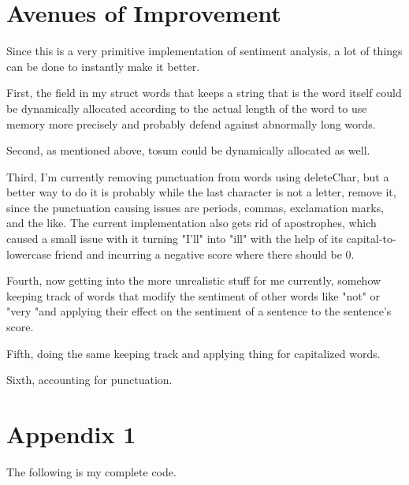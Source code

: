 \documentclass{article}
\begin{document}
\section{Avenues of Improvement}

Since this is a very primitive implementation of sentiment analysis, a lot of things can be done to instantly make it better. 

First, the field in my struct words that keeps a string that is the word itself could be dynamically allocated according to the actual length of the word to use memory more precisely and probably defend against abnormally long words. 

Second, as mentioned above, tosum could be dynamically allocated as well. 

Third, I'm currently removing punctuation from words using deleteChar, but a better way to do it is probably while the last character is not a letter, remove it, since the punctuation causing issues are periods, commas, exclamation marks, and the like. The current implementation also gets rid of apostrophes, which caused a small issue with it turning "I'll" into "ill" with the help of its capital-to-lowercase friend and incurring a negative score where there should be 0. 

Fourth, now getting into the more unrealistic stuff for me currently, somehow keeping track of words that modify the sentiment of other words like "not" or "very "and applying their effect on the sentiment of a sentence to the sentence's score. 

Fifth, doing the same keeping track and applying thing for capitalized words. 

Sixth, accounting for punctuation. 

\section{Appendix 1}

The following is my complete code. 
\end{document}
